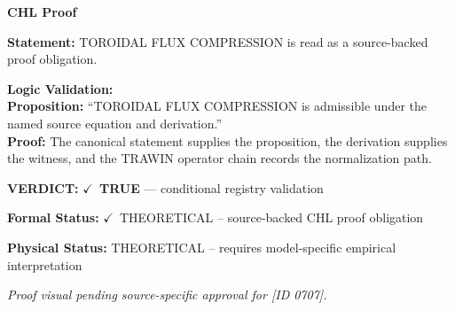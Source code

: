 \vspace{0.45em}
\noindent\textbf{CHL Proof}\par
\textbf{Statement:} TOROIDAL FLUX COMPRESSION is read as a source-backed proof obligation.

\textbf{Logic Validation:}\\
\textbf{Proposition:} ``TOROIDAL FLUX COMPRESSION is admissible under the named source equation and derivation.''\\
\textbf{Proof:} The canonical statement supplies the proposition, the derivation supplies the witness, and the TRAWIN operator chain records the normalization path.

\textbf{VERDICT:} \ensuremath{\checkmark}\ \textbf{TRUE} --- conditional registry validation

\textbf{Formal Status:} \ensuremath{\checkmark}\ THEORETICAL -- source-backed CHL proof obligation

\textbf{Physical Status:} THEORETICAL -- requires model-specific empirical interpretation
\par\vspace{0.45em}
\par
\vfill
\begingroup\footnotesize\itshape
Proof visual pending source-specific approval for [ID 0707].
\par\endgroup
\vfill
\endgroup
\endgroup
